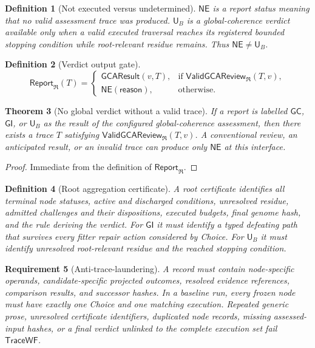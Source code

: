 \documentclass[10pt]{article}
\newtheorem{definition}{Definition}[section]
\newtheorem{theorem}[definition]{Theorem}
\newtheorem{requirement}[definition]{Requirement}
\newcommand{\GC}{\mathsf{GC}}
\newcommand{\GI}{\mathsf{GI}}
\newcommand{\UB}{\mathsf{U}_B}
\newcommand{\NE}{\mathsf{NE}}
\newcommand{\TraceWF}{\mathsf{TraceWF}}
\newcommand{\ValidReview}{\mathsf{ValidGCAReview}}
\newcommand{\Report}{\mathsf{Report}}
\begin{document}
\begin{definition}[Not executed versus undetermined]
$\NE$ is a report status meaning that no valid assessment trace was produced.  $\UB$ is a global-coherence verdict available only when a valid executed traversal reaches its registered bounded stopping condition while root-relevant residue remains.  Thus $\NE\neq\UB$.
\end{definition}

\begin{definition}[Verdict output gate]
\[
\Report_{\mathfrak R}(T)=
\begin{cases}
\mathsf{GCAResult}(v,T),&\text{if }\ValidReview_{\mathfrak R}(T,v),\\
\NE(\mathsf{reason}),&\text{otherwise}.
\end{cases}
\]
\end{definition}

\begin{theorem}[No global verdict without a valid trace]\label{thm:output-gate}
If a report is labelled $\GC$, $\GI$, or $\UB$ as the result of the configured global-coherence assessment, then there exists a trace $T$ satisfying $\ValidReview_{\mathfrak R}(T,v)$.  A conventional review, an anticipated result, or an invalid trace can produce only $\NE$ at this interface.
\end{theorem}

\begin{proof}
Immediate from the definition of $\Report_{\mathfrak R}$.
\end{proof}

\begin{definition}[Root aggregation certificate]
A root certificate identifies all terminal node statuses, active and discharged conditions, unresolved residue, admitted challenges and their dispositions, executed budgets, final genome hash, and the rule deriving the verdict.  For $\GI$ it must identify a typed defeating path that survives every fitter repair action considered by Choice.  For $\UB$ it must identify unresolved root-relevant residue and the reached stopping condition.
\end{definition}

\begin{requirement}[Anti-trace-laundering]
A record must contain node-specific operands, candidate-specific projected outcomes, resolved evidence references, comparison results, and successor hashes.  In a baseline run, every frozen node must have exactly one Choice and one matching execution.  Repeated generic prose, unresolved certificate identifiers, duplicated node records, missing assessed-input hashes, or a final verdict unlinked to the complete execution set fail $\TraceWF$.
\end{requirement}
\end{document}
